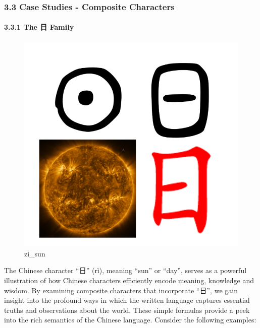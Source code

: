 \documentclass[
  11pt,
  letterpaper,
]{article}
\begin{document}
\hypertarget{case-studies---composite-characters}{%
\subsubsection{3.3 Case Studies - Composite
Characters}\label{case-studies---composite-characters}}

\hypertarget{the-ux65e5-family}{%
\paragraph{3.3.1 The 日 Family}\label{the-ux65e5-family}}

\begin{figure}
\centering
\includegraphics{./images/zi_sun.png}
\caption{zi\_sun}
\end{figure}

The Chinese character ``日'' (rì), meaning ``sun'' or ``day'', serves as
a powerful illustration of how Chinese characters efficiently encode
meaning, knowledge and wisdom. By examining composite characters that
incorporate ``日'', we gain insight into the profound ways in which the
written language captures essential truths and observations about the
world. These simple formulas provide a peek into the rich semantics of
the Chinese language. Consider the following examples:
\end{document}
